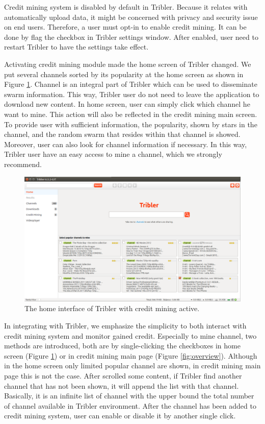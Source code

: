 Credit mining system is disabled by default in Tribler. Because it relates with automatically upload data, it might be concerned with privacy and security issue on end users. Therefore, a user must opt-in to enable credit mining. It can be done by flag the checkbox in Tribler settings window. After enabled, user need to restart Tribler to have the settings take effect. 

Activating credit mining module made the home screen of Tribler changed. We put several channels sorted by its popularity at the home screen as shown in Figure \ref{fig:homecm}. Channel is an integral part of Tribler which can be used to disseminate swarm information. This way, Tribler user do not need to leave the application to download new content. In home screen, user can simply click which channel he want to mine. This action will also be reflected in the credit mining main screen. To provide user with sufficient information, the popularity, shown by stars in the channel, and the random swarm that resides within that channel is showed. Moreover, user can also look for channel information if necessary. In this way, Tribler user have an easy access to mine a channel, which we strongly recommend.

\begin{figure}
	\includegraphics[width=\textwidth]{pics/home_channel.png}
	\caption{The home interface of Tribler with credit mining active.}
	\label{fig:homecm}
\end{figure}

In integrating with Tribler, we emphasize the simplicity to both interact with credit mining system and monitor gained credit. Especially to mine channel, two methods are introduced, both are by single-clicking the checkboxes in home screen (Figure \ref{fig:homecm}) or in credit mining main page (Figure \ref{fig:overview}). Although in the home screen only limited popular channel are shown, in credit mining main page this is not the case. After scrolled some content, if Tribler find another channel that has not been shown, it will append the list with that channel. Basically, it is an infinite list of channel with the upper bound the total number of channel available in Tribler environment. After the channel has been added to credit mining system, user can enable or disable it by another single click.

